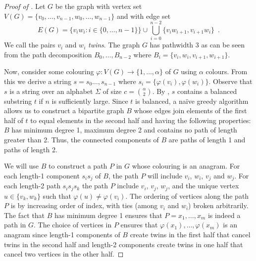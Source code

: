 \documentclass{patmorin}
\begin{document}
\begin{proof}[Proof of ]
Let $G$ be the graph with vertex set
$V(G)=\{v_0,\ldots,v_{n-1},w_0,\ldots,w_{n-1}\}$ and with edge set
\[
  E(G) = \{v_iw_i : i\in\{0,\ldots,n-1\}\} \cup \bigcup_{i=0}^{n-2} \{v_iw_{i+1},v_{i+1}w_i\} \enspace .
\]
We call the pairs $v_i$ and $w_i$ \emph{twins}.
The graph $G$ has pathwidth 3 as can be seen from the path decomposition $B_0,\ldots,B_{n-2}$ where $B_i=\{v_i,w_i,v_{i+1},w_{i+1}\}$.

Now, consider some colouring $\varphi:V(G)\to\{1,\ldots,\alpha\}$ of $G$
using $\alpha$ colours. From this we derive a string $s=s_0\ldots,s_{n-1}$
where $s_i=\{\varphi(v_i),\varphi(w_i)\}$.  Observe that $s$ is
a string over an alphabet $\Sigma$ of size $c=\binom{\alpha}{2}$.
By , $s$ contains a balanced substring $t$ if $n$
is sufficiently large.  Since $t$
is balanced, a na\"ive greedy algorithm allows us to construct a bipartite
 graph $B$ whose edges join
elements of the first half of $t$ to equal elements in the second half
and having the following properties: $B$ has minimum degree 1, maximum
degree 2 and contains no path of length greater than 2.  Thus, the
connected components of $B$ are paths of length 1 and paths of length 2.

We will use $B$ to construct a path $P$ in $G$ whose colouring is an
anagram.  For each length-1 component $s_is_j$ of $B$, the path $P$
will include $v_i$, $w_i$, $v_j$ and $w_j$.  For each length-2 path
$s_is_js_k$ the path $P$ include $v_i$, $v_j$, $w_j$, and the unique
vertex $u\in\{v_k,w_k\}$ such that $\varphi(u)\neq \varphi(v_i)$.
The ordering of vertices along the path $P$ is by increasing order
of index, with ties (among $v_i$ and $w_i$) broken arbitrarily.
The fact that $B$ has minimum degree 1 ensures that $P=x_1,\ldots,x_m$
is indeed a path in $G$.  The choice of vertices in $P$ ensures that
$\varphi(x_1),\ldots,\varphi(x_m)$ is an anagram since length-1 components
of $B$ create twins in the first half that cancel twins in the second
half and length-2 components create twins in one half that cancel two
vertices in the other half.
\end{proof}
\end{document}
